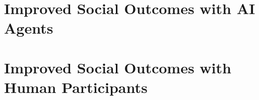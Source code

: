 \documentclass{article}
\begin{document}
\section{Improved Social Outcomes with AI Agents}
\label{sec:expai}




\section{Improved Social Outcomes with Human Participants}
\label{sec:exphuman}












\appendix



\end{document}
